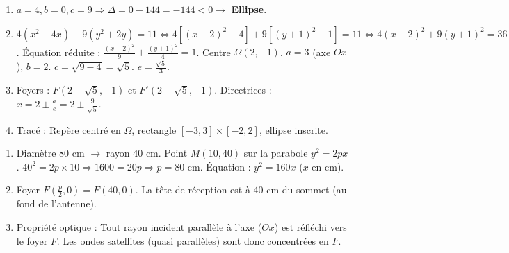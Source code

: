 \documentclass[11pt]{article}
\begin{document}
\begin{corrige}[Exercice 1]
\begin{enumerate}
    \item $a=4, b=0, c=9 \Rightarrow \Delta = 0 - 144 = -144 < 0 \rightarrow$ \textbf{Ellipse}.
    \item $4(x^2 - 4x) + 9(y^2 + 2y) = 11 \iff 4[(x-2)^2 - 4] + 9[(y+1)^2 - 1] = 11 \iff 4(x-2)^2 + 9(y+1)^2 = 36$.
    Équation réduite : $\frac{(x-2)^2}{9} + \frac{(y+1)^2}{4} = 1$.
    Centre $\Omega(2, -1)$. $a=3$ (axe $Ox$), $b=2$. $c = \sqrt{9-4} = \sqrt{5}$. $e = \frac{\sqrt{5}}{3}$.
    \item Foyers : $F(2-\sqrt{5}, -1)$ et $F'(2+\sqrt{5}, -1)$.
    Directrices : $x = 2 \pm \frac{a}{e} = 2 \pm \frac{9}{\sqrt{5}}$.
    \item Tracé : Repère centré en $\Omega$, rectangle $[-3,3]\times[-2,2]$, ellipse inscrite.
\end{enumerate}
\end{corrige}

\begin{corrige}[Exercice 2]
\begin{enumerate}
    \item Diamètre 80 cm $\rightarrow$ rayon 40 cm. Point $M(10, 40)$ sur la parabole $y^2 = 2px$.
    $40^2 = 2p \times 10 \Rightarrow 1600 = 20p \Rightarrow p = 80$ cm.
    Équation : $y^2 = 160x$ ($x$ en cm).
    \item Foyer $F(\frac{p}{2}, 0) = F(40, 0)$. La tête de réception est à 40 cm du sommet (au fond de l'antenne).
    \item Propriété optique : Tout rayon incident parallèle à l'axe ($Ox$) est réfléchi vers le foyer $F$. Les ondes satellites (quasi parallèles) sont donc concentrées en $F$.
\end{enumerate}
\end{corrige}
\end{document}
